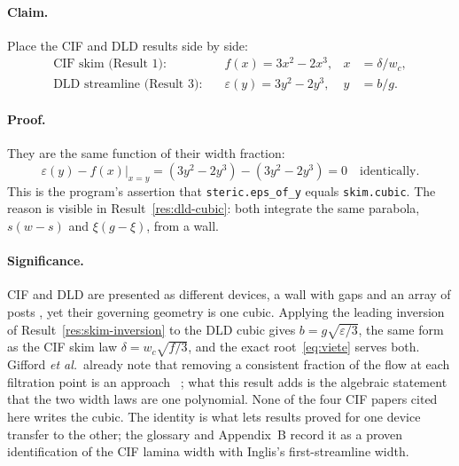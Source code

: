 \label{res:cubic-identity}

\paragraph{Claim.} Place the CIF and DLD results side by side:
\begin{align}
\text{CIF skim (Result 1):}&\quad f(x) = 3x^2 - 2x^3, & x&=\delta/w_c, \\
\text{DLD streamline (Result 3):}&\quad \varepsilon(y) = 3y^2 - 2y^3, & y&=b/g.
\end{align}

\paragraph{Proof.} They are the same function of their width fraction:
\begin{equation}
\varepsilon(y) - f(x)\big|_{x=y} = (3y^2 - 2y^3) - (3y^2 - 2y^3) = 0 \quad\text{identically.}
\end{equation}
This is the program's assertion that \texttt{steric.eps\_of\_y} equals \texttt{skim.cubic}.
The reason is visible in Result~\ref{res:dld-cubic}: both integrate the same parabola,
$s(w-s)$ and $\xi(g-\xi)$, from a wall.

\paragraph{Significance.} CIF and DLD are presented as different devices, a wall with gaps
\cite{b1} and an array of posts \cite{b17,bdavis06}, yet their governing
geometry is one cubic. Applying the leading inversion of Result~\ref{res:skim-inversion} to
the DLD cubic gives $b = g\sqrt{\varepsilon/3}$, the same form as the CIF skim law
$\delta = w_c\sqrt{f/3}$, and the exact root~\eqref{eq:viete} serves both. Gifford
\emph{et al.}\ already note that removing a consistent fraction of the flow at each filtration
point is an approach
~\cite[p.~4503]{b1};
what this result adds is the algebraic statement that the two width laws are one polynomial.
None of the four CIF papers cited here writes the cubic. The identity is what lets results
proved for one device transfer to the other; the glossary and Appendix~B record it as a proven
identification of the CIF lamina width with Inglis's first-streamline width.

